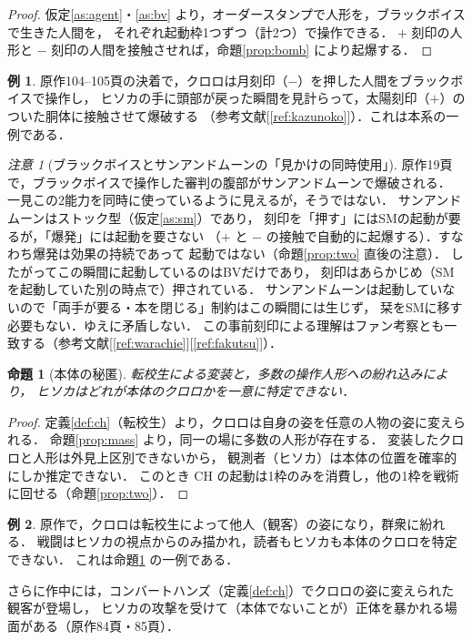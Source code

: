\documentclass[a4paper,12pt]{jarticle}
\theoremstyle{definition}
\theoremstyle{plain}
\newtheorem{prop}{命題}
\theoremstyle{definition}
\newtheorem{ex}{例}
\theoremstyle{remark}
\newtheorem*{remark}{注意}
\newcommand{\CH}{\mathrm{CH}}    %
\begin{document}
\begin{proof}
仮定\ref{as:agent}・\ref{as:bv} より，オーダースタンプで人形を，ブラックボイスで生きた人間を，
それぞれ起動枠1つずつ（計2つ）で操作できる．
$+$ 刻印の人形と $-$ 刻印の人間を接触させれば，命題\ref{prop:bomb} により起爆する．
\end{proof}

\begin{ex}
原作104--105頁の決着で，クロロは月刻印（$-$）を押した人間をブラックボイスで操作し，
{ヒソカの手に頭部が戻った瞬間}を見計らって，太陽刻印（$+$）のついた胴体に接触させて爆破する
（参考文献[\ref{ref:kazunoko}]）．これは本系の一例である．
\end{ex}

\begin{remark}[ブラックボイスとサンアンドムーンの「見かけの同時使用」]
原作19頁で，ブラックボイスで操作した審判の腹部がサンアンドムーンで爆破される．
一見この2能力を同時に使っているように見えるが，そうではない．
サンアンドムーンはストック型（仮定\ref{as:sm}）であり，
{刻印を「押す」にはSMの起動が要るが，「爆発」には起動を要さない}
（$+$ と $-$ の接触で自動的に起爆する）．すなわち爆発は{効果の持続}であって
{起動}ではない（命題\ref{prop:two} 直後の注意）．
したがってこの瞬間に起動しているのはBVだけであり，
刻印は{あらかじめ}（SMを起動していた別の時点で）押されている．
サンアンドムーンは起動していないので「両手が要る・本を閉じる」制約はこの瞬間には生じず，
栞をSMに移す必要もない．ゆえに矛盾しない．
この{事前刻印}による理解はファン考察とも一致する（参考文献[\ref{ref:warachie}][\ref{ref:fakutsu}]）．
\end{remark}

\begin{prop}[本体の秘匿]\label{prop:hide}
転校生による変装と，多数の操作人形への紛れ込みにより，
ヒソカはどれが本体のクロロかを一意に特定できない．
\end{prop}

\begin{proof}
定義\ref{def:ch}（転校生）より，クロロは自身の姿を任意の人物の姿に変えられる．
命題\ref{prop:mass} より，同一の場に多数の人形が存在する．
変装したクロロと人形は外見上区別できないから，
観測者（ヒソカ）は本体の位置を確率的にしか推定できない．
このとき $\CH$ の起動は1枠のみを消費し，他の1枠を戦術に回せる（命題\ref{prop:two}）．
\end{proof}

\begin{ex}
原作で，クロロは転校生によって他人（観客）の姿になり，群衆に紛れる．
戦闘はヒソカの視点からのみ描かれ，読者もヒソカも本体のクロロを特定できない．
これは命題\ref{prop:hide} の一例である．

さらに作中には，コンバートハンズ（定義\ref{def:ch}）で{クロロの姿に変えられた観客}が登場し，
ヒソカの攻撃を受けて（本体でないことが）{正体を暴かれる}場面がある（原作84頁・85頁）．
\end{ex}
\end{document}

